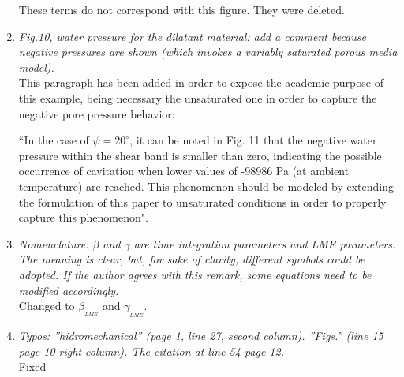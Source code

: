 \documentclass[12pt]{article}
\begin{document}
\begin{enumerate}
These terms do not correspond with this figure. They were deleted.

\item \textit{Fig.10, water pressure for the dilatant material: add a comment because negative pressures are shown (which invokes a variably saturated porous media model).}\\

This paragraph has been added in order to expose the academic purpose of this example, being necessary the unsaturated one in order to capture the negative pore pressure behavior:

``In the case of $\psi=20^\circ$, it can be noted in Fig. 11 that the negative water pressure within the shear band is smaller than zero, indicating the possible occurrence of cavitation when lower values of -98986 Pa (at ambient temperature) are reached. This phenomenon should be modeled by extending the formulation of this paper to unsaturated conditions in order to properly capture this phenomenon".

\item \textit{Nomenclature: $\beta$ and $\gamma$ are time integration parameters and LME parameters. The meaning is clear, but, for sake of clarity, different symbols could be adopted. If the author agrees with this remark, some equations need to be modified accordingly.}\\

Changed to $\beta__{LME}$ and $\gamma__{LME}$.

\item \textit{Typos: ''hidromechanical'' (page 1, line 27, second column). ''Figs.'' (line 15 page 10 right column). The citation at line 54 page 12.}\\

Fixed

\end{enumerate}
\end{document}
